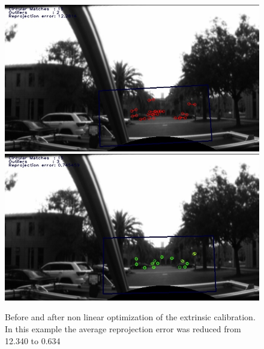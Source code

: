 \begin{figure}[h!]
  \centering
    \includegraphics[width=1.0\textwidth]{chapters/images/verify_before_opt}
    \includegraphics[width=1.0\textwidth]{chapters/images/verify_after_opt}
  \caption{Before and after non linear optimization of the extrinsic calibration.  In this example the average reprojection error was reduced from 12.340 to 0.634}
  \label{fig:before_after_g2o}
\end{figure}